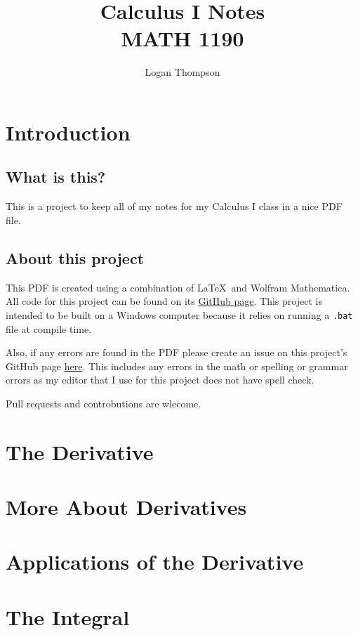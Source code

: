 

\title{
    Calculus I Notes\\
    \large MATH 1190}
\author{Logan Thompson}
\date{}


\hypersetup{pageanchor=false}
\maketitle
\hypersetup{pageanchor=true}
\tableofcontents
\newpage
\chapter*{Introduction}
\section*{What is this?}
This is a project to keep all of my notes for my Calculus I class in a nice PDF file.
\section*{About this project}
This PDF is created using a combination of \LaTeX\ and Wolfram Mathematica. All code for this project can be found on its \href{https://github.com/Cobbleopolis/Calculus-Notes}{GitHub page}. This project is intended to be built on a Windows computer because it relies on running a \texttt{.bat} file at compile time.

Also, if any errors are found in the PDF please create an issue on this project's GitHub page \href{https://github.com/Cobbleopolis/Calculus-Notes/issues}{here}. This includes any errors in the math or spelling or grammar errors as my editor that I use for this project does not have spell check.

Pull requests and controbutions are wlecome.
\chapter{The Derivative}





\chapter{More About Derivatives}




\chapter{Applications of the Derivative}








\chapter{The Integral}



\appendix


